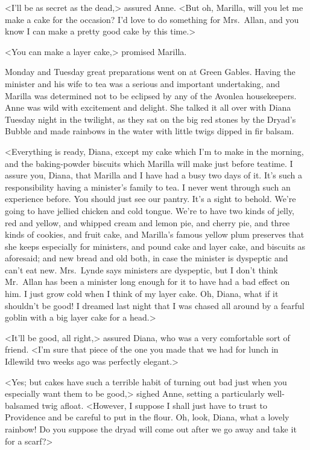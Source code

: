 <I'll be as secret as the dead,> assured Anne. <But oh, Marilla, will you let me make a cake for the occasion? I'd love to do something for Mrs.~Allan, and you know I can make a pretty good cake by this time.>

<You can make a layer cake,> promised Marilla.

Monday and Tuesday great preparations went on at Green Gables. Having the minister and his wife to tea was a serious and important undertaking, and Marilla was determined not to be eclipsed by any of the Avonlea housekeepers. Anne was wild with excitement and delight. She talked it all over with Diana Tuesday night in the twilight, as they sat on the big red stones by the Dryad's Bubble and made rainbows in the water with little twigs dipped in fir balsam.

<Everything is ready, Diana, except my cake which I'm to make in the morning, and the baking-powder biscuits which Marilla will make just before teatime. I assure you, Diana, that Marilla and I have had a busy two days of it. It's such a responsibility having a minister's family to tea. I never went through such an experience before. You should just see our pantry. It's a sight to behold. We're going to have jellied chicken and cold tongue. We're to have two kinds of jelly, red and yellow, and whipped cream and lemon pie, and cherry pie, and three kinds of cookies, and fruit cake, and Marilla's famous yellow plum preserves that she keeps especially for ministers, and pound cake and layer cake, and biscuits as aforesaid; and new bread and old both, in case the minister is dyspeptic and can't eat new. Mrs.~Lynde says ministers are dyspeptic, but I don't think Mr.~Allan has been a minister long enough for it to have had a bad effect on him. I just grow cold when I think of my layer cake. Oh, Diana, what if it shouldn't be good! I dreamed last night that I was chased all around by a fearful goblin with a big layer cake for a head.>

<It'll be good, all right,> assured Diana, who was a very comfortable sort of friend. <I'm sure that piece of the one you made that we had for lunch in Idlewild two weeks ago was perfectly elegant.>

<Yes; but cakes have such a terrible habit of turning out bad just when you especially want them to be good,> sighed Anne, setting a particularly well-balsamed twig afloat. <However, I suppose I shall just have to trust to Providence and be careful to put in the flour. Oh, look, Diana, what a lovely rainbow! Do you suppose the dryad will come out after we go away and take it for a scarf?>

